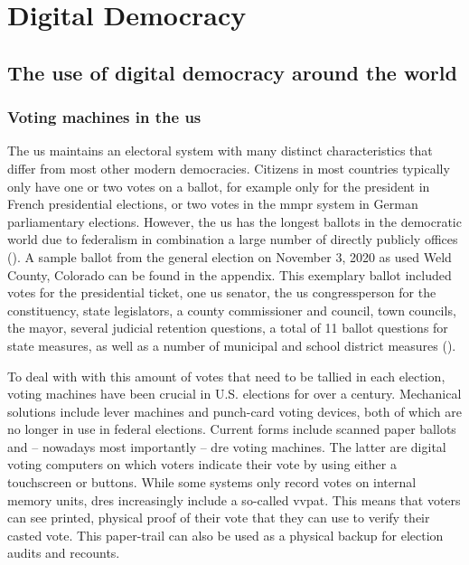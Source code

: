 






\chapter{Digital Democracy}
\section{The use of digital democracy around the world}

\subsection{Voting machines in the \acrshort{us}}
The \acrfull{us} maintains an electoral system with many distinct characteristics that differ from most other modern democracies. Citizens in most countries typically only have one or two votes on a ballot, for example only for the president in French presidential elections, or two votes in the \acrfull{mmpr} system in German parliamentary elections. However, the \acrshort{us} has the longest ballots in the democratic world due to federalism in combination a large number of directly publicly offices (\cite{MITElectionLab+ScienceLab.}). A sample ballot from the general election on November 3, 2020 as used Weld County, Colorado can be found in the appendix. This exemplary ballot included votes for the presidential ticket, one \acrshort{us} senator, the \acrshort{us} congressperson for the constituency, state legislators, a county commissioner and council, town councils, the mayor, several judicial retention questions, a total of 11 ballot questions for state measures, as well as a number of municipal and school district measures (\cite{Williams.2020}).

To deal with with this amount of votes that need to be tallied in each election, voting machines have been crucial in U.S. elections for over a century. Mechanical solutions include lever machines and punch-card voting devices, both of which are no longer in use in federal elections. Current forms include scanned paper ballots and -- nowadays most importantly -- \acrfull{dre} voting machines. The latter are digital voting computers on which voters indicate their vote by using either a touchscreen or buttons. While some systems only record votes on internal memory units, \acrshort{dre}s increasingly include a so-called \acrfull{vvpat}. This means that voters can see printed, physical proof of their vote that they can use to verify their casted vote. This paper-trail can also be used as a physical backup for election audits and recounts.

